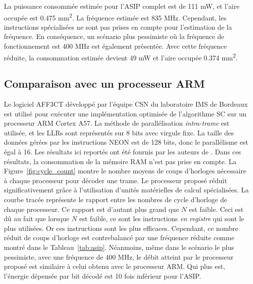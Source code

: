La puissance consommée estimée pour l'ASIP complet est de 111 mW, et l'aire occupée est 0.475 mm\textsuperscript{2}. La fréquence estimée est 835 MHz. Cependant, les instructions spécialisées ne sont pas prises en compte pour l'estimation de la fréquence. En conséquence, un scénario plus pessimiste où la fréquence de fonctionnement est 400 MHz est également présentée. Avec cette fréquence réduite, la consommation estimée devient 49 mW et l'aire occupée 0.374 mm\textsuperscript{2}.

\subsection{Comparaison avec un processeur ARM}


Le logiciel AFF3CT développé par l'équipe CSN du laboratoire IMS de Bordeaux est utilisé pour exécuter une implémentation optimisée de l'algorithme SC sur un processeur ARM Cortex A57. La méthode de parallélisation \textit{intra-trame} est utilisée, et les LLRs sont représentés sur 8 bits avec virgule fixe. La taille des données gérées par les instructions NEON est de 128 bits, donc le parallélisme est égal à 16. Les résultats ici reportés ont été fournis par les auteurs de \cite{cassagne_energy_2016}. Dans ces résultats, la consommation de la mémoire RAM n'est pas prise en compte.
La Figure~\ref{fig:cycle_count} montre le nombre moyens de coups d'horloges nécessaire à chaque processeur pour décoder une trame. Le processeur proposé réduit significativement grâce à l'utilisation d'unités matérielles de calcul spécialisées. La courbe tracée représente le rapport entre les nombres de cycle d'horloge de chaque processeur. Ce rapport est d'autant plus grand que $N$ est faible. Ceci est dû au fait que lorsque $N$ est faible, ce sont les instructions \textit{en registre} qui sont le plus utilisées. Or ces instructions sont les plus efficaces.
Cependant, ce nombre réduit de coups d'horloge est contrebalancé par une fréquence réduite comme montré dans le Tableau~\ref{tab:asip}. Néanmoins, même dans le scénario le plus pessimiste, avec une fréquence de 400 MHz, le débit atteint par le processeur proposé est similaire à celui obtenu avec le processeur ARM. Qui plus est, l'énergie dépensée par bit décodé est 10 fois inférieur pour l'ASIP.
